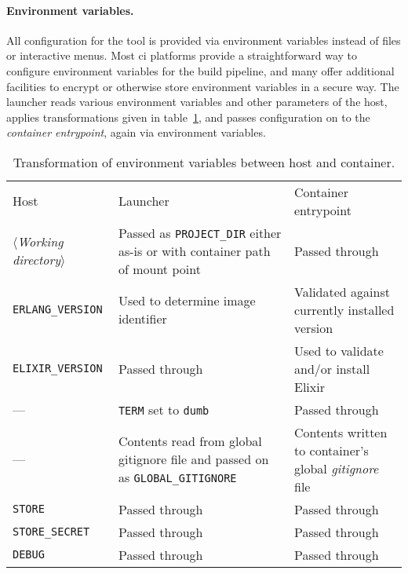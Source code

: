 \paragraph{Environment variables.} All configuration for the tool is provided via environment variables instead of files or interactive menus. Most \acrlong{ci} platforms provide a straightforward way to configure environment variables for the build pipeline, and many offer additional facilities to encrypt or otherwise store environment variables in a secure way. The launcher reads various environment variables and other parameters of the host, applies transformations given in table~\ref{table:envvars}, and passes configuration on to the \emph{container entrypoint}, again via environment variables.

\begin{table}[h]
  \setlength{\tabcolsep}{10pt}
  \centering
  \begin{tabularx}{\textwidth}{l X X}
    Host & Launcher & Container entrypoint \\
    \hhline{===}
    $\langle$\emph{Working directory}$\rangle$ &
      Passed as \lstinline|PROJECT_DIR| \newline
      either as-is or with container path of mount point &
      Passed through \\
    \hline
    \lstinline|ERLANG_VERSION| &
      Used to determine \newline
      image identifier &
      Validated against \newline
      currently installed version \\
    \hline
    \lstinline|ELIXIR_VERSION| &
      Passed through &
      Used to validate and/or \newline
      install Elixir \\
    \hline
    --- &
      \lstinline|TERM| set to \lstinline|dumb| &
      Passed through \\
    \hline
    --- &
      Contents read from global gitignore
      file and passed on as \lstinline|GLOBAL_GITIGNORE| &
      Contents written to \newline
      container's global \newline
      \emph{gitignore} file \\
    \hline
    \lstinline|STORE| & Passed through & Passed through \\
    \hline
    \lstinline|STORE_SECRET| & Passed through & Passed through \\
    \hline
    \lstinline|DEBUG| & Passed through & Passed through \\
    \hline
  \end{tabularx}
  \caption{Transformation of environment variables between host and container.}\label{table:envvars}
\end{table}

